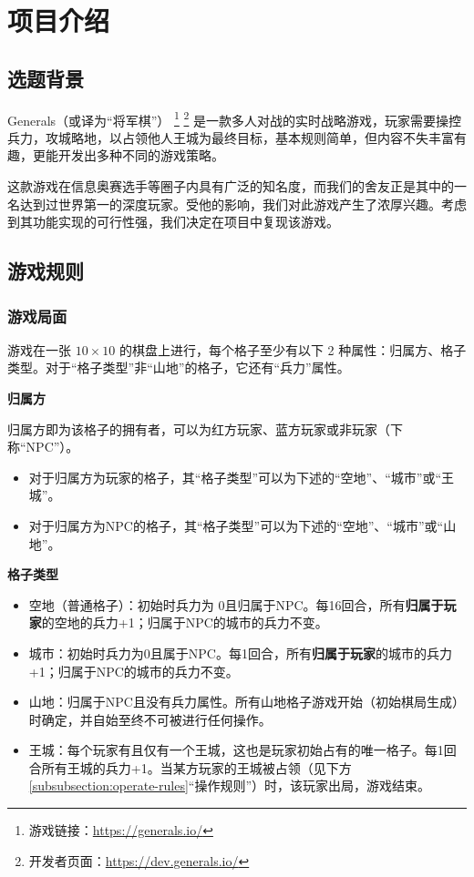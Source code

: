\section{项目介绍}
\subsection{选题背景}

Generals（或译为“将军棋”）
\footnote{游戏链接：\href{https://generals.io/}{https://generals.io/}}
\footnote{开发者页面：\href{https://dev.generals.io/}{https://dev.generals.io/}}
是一款多人对战的实时战略游戏，玩家需要操控兵力，攻城略地，以占领他人王城为最终目标，基本规则简单，但内容不失丰富有趣，更能开发出多种不同的游戏策略。

这款游戏在信息奥赛选手等圈子内具有广泛的知名度，而我们的舍友正是其中的一名达到过世界第一的深度玩家。受他的影响，我们对此游戏产生了浓厚兴趣。考虑到其功能实现的可行性强，我们决定在项目中复现该游戏。




\subsection{游戏规则}

\subsubsection{游戏局面}

游戏在一张 $10\times 10$ 的棋盘上进行，每个格子至少有以下 2 种属性：归属方、格子类型。对于“格子类型”非“山地”的格子，它还有“兵力”属性。

\noindent \textbf{归属方}

归属方即为该格子的拥有者，可以为红方玩家、蓝方玩家或非玩家（下称“NPC”）。
\begin{itemize}
    \item 对于归属方为玩家的格子，其“格子类型”可以为下述的“空地”、“城市”或“王城”。
    \item 对于归属方为NPC的格子，其“格子类型”可以为下述的“空地”、“城市”或“山地”。
\end{itemize}


\noindent \textbf{格子类型}
\begin{itemize}
    \item 空地（普通格子）：初始时兵力为 0且归属于NPC。每16回合，所有\textbf{归属于玩家}的空地的兵力+1；归属于NPC的城市的兵力不变。
    \item 城市：初始时兵力为0且属于NPC。每1回合，所有\textbf{归属于玩家}的城市的兵力+1；归属于NPC的城市的兵力不变。
    \item 山地：归属于NPC且没有兵力属性。所有山地格子游戏开始（初始棋局生成）时确定，并自始至终不可被进行任何操作。
    \item 王城：每个玩家有且仅有一个王城，这也是玩家初始占有的唯一格子。每1回合所有王城的兵力+1。当某方玩家的王城被占领（见下方 \ref{subsubsection:operate-rules}“操作规则”）时，该玩家出局，游戏结束。
\end{itemize}

